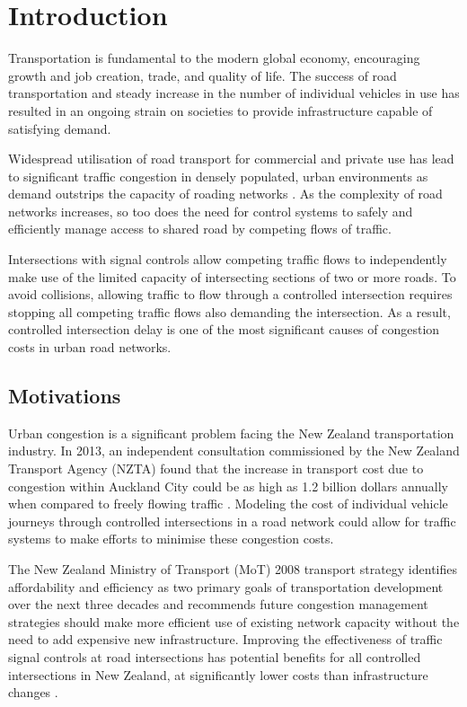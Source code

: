\chapter{Introduction}

Transportation is fundamental to the modern global economy, encouraging growth and job creation, trade, and quality of life. The success of road transportation and steady increase in the number of individual vehicles in use has resulted in an ongoing strain on societies to provide infrastructure capable of satisfying demand. 

Widespread utilisation of road transport for commercial and private use has lead to significant traffic congestion in densely populated, urban environments as demand outstrips the capacity of roading networks \cite{euro2011whitepaper,papa2003review}. As the complexity of road networks increases, so too does the need for control systems to safely and efficiently manage access to shared road by competing flows of traffic. 

Intersections with signal controls allow competing traffic flows to independently make use of the limited capacity of intersecting sections of  two or more roads. To avoid collisions, allowing traffic to flow through a controlled intersection requires stopping all competing traffic flows also demanding the intersection. As a result, controlled intersection delay is one of the most significant causes of congestion costs in urban road networks.

\section {Motivations}

Urban congestion is a significant problem facing the New Zealand transportation industry. In 2013, an independent consultation commissioned by the New Zealand Transport Agency (NZTA) found that the increase in transport cost due to congestion within Auckland City could be as high as 1.2 billion dollars annually when compared to freely flowing traffic \cite{wallis2013costs}. Modeling the cost of individual vehicle journeys through controlled intersections in a road network could allow for traffic systems to make efforts to minimise these congestion costs.

The New Zealand Ministry of Transport (MoT) 2008 transport strategy identifies affordability and efficiency as two primary goals of transportation development over the next three decades and recommends future congestion management strategies should make more efficient use of existing network capacity without the need to add expensive new infrastructure. Improving the effectiveness of traffic signal controls at road intersections has potential benefits for all controlled intersections in New Zealand, at significantly lower costs than infrastructure changes \cite{mot2008strategy}.

